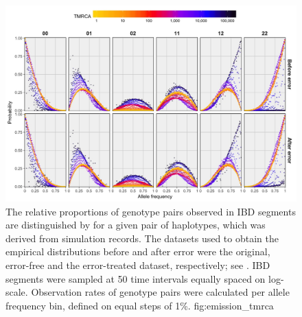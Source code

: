 

\begin{figure}[!htb]
\includegraphics[width=\textwidth]{./img/ch4/emission_tmrca_reduced_new}
{The relative proportions of genotype pairs observed in IBD segments are distinguished by  for a given pair of haplotypes, which was derived from simulation records.
The datasets used to obtain the empirical distributions before and after error were the original, error-free and the error-treated dataset, respectively; see .
IBD segments were sampled at 50 time intervals equally spaced on log-scale.
Observation rates of genotype pairs were calculated per allele frequency bin, defined on equal steps of 1\%.\CorrectLabel}
{fig:emission_tmrca}
\end{figure}
